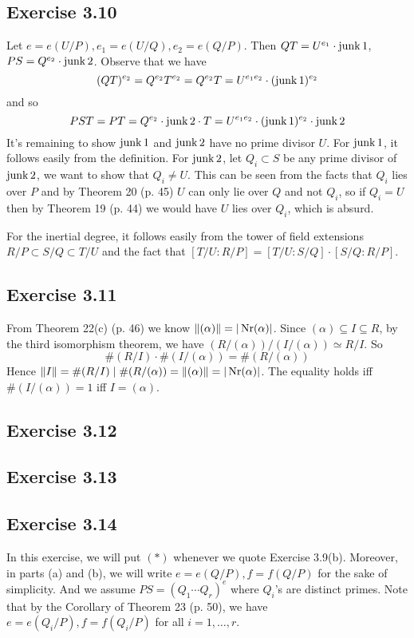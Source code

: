 \documentclass[../Marcus.tex]{subfiles}
\begin{document}
\subsection*{Exercise 3.10}

Let $e=e(U/P),e_1=e(U/Q),e_2=e(Q/P)$. Then $QT=U^{e_1}\cdot\operatorname{junk}1$, $PS=Q^{e_2}\cdot\operatorname{junk}2$. Observe that we have $$(QT)^{e_2}=Q^{e_2}T^{e_2}=Q^{e_2}T=U^{e_1e_2}\cdot(\operatorname{junk}1)^{e_2}$$ and so $$PST=PT=Q^{e_2}\cdot\operatorname{junk}2\cdot T=U^{e_1e_2}\cdot(\operatorname{junk}1)^{e_2}\cdot\operatorname{junk}2$$ It's remaining to show $\operatorname{junk}1$ and $\operatorname{junk}2$ have no prime divisor $U$. For $\operatorname{junk}1$, it follows easily from the definition. For $\operatorname{junk}2$, let $Q_i\subset S$ be any prime divisor of $\operatorname{junk}2$, we want to show that $Q_i\neq U$. This can be seen from the facts that $Q_i$ lies over $P$ and by Theorem 20 (p. 45) $U$ can only lie over $Q$ and not $Q_i$, so if $Q_i=U$ then by Theorem 19 (p. 44) we would have $U$ lies over $Q_i$, which is absurd.

For the inertial degree, it follows easily from the tower of field extensions $R/P\subset S/Q\subset T/U$ and the fact that $[T/U:R/P]=[T/U:S/Q]\cdot[S/Q:R/P]$.

\subsection*{Exercise 3.11}

From Theorem 22(c) (p. 46) we know $\|(\alpha)\|=|\operatorname{Nr}(\alpha)|$. Since $(\alpha)\subseteq I \subseteq R$, by the third isomorphism theorem, we have $(R/(\alpha))/(I/(\alpha))\simeq R/I$. So $$\#(R/I)\cdot\#(I/(\alpha))=\#(R/(\alpha))$$ Hence $\|I\|=\#(R/I)\mid \#(R/(\alpha))=\|(\alpha)\|=|\operatorname{Nr}(\alpha)|$. The equality holds iff $\#(I/(\alpha))=1$ iff $I=(\alpha)$.

\subsection*{Exercise 3.12}

\subsection*{Exercise 3.13}

\subsection*{Exercise 3.14}

In this exercise, we will put $(*)$ whenever we quote Exercise 3.9(b). Moreover, in parts (a) and (b), we will write $e=e(Q/P),f=f(Q/P)$ for the sake of simplicity. And we assume $PS=(Q_1\cdots Q_r)^e$ where $Q_i$'s are distinct primes. Note that by the Corollary of Theorem 23 (p. 50), we have $e=e(Q_i/P),f=f(Q_i/P)$ for all $i=1,\ldots,r$.
\end{document}
